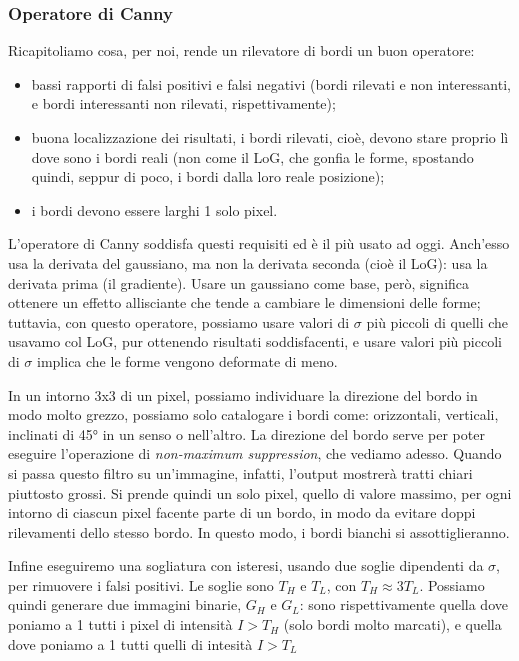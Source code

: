 \documentclass[a4paper,11pt]{article}
\begin{document}
\subsubsection{Operatore di Canny}
Ricapitoliamo cosa, per noi, rende un rilevatore di bordi un buon operatore:
\begin{itemize}
    \item bassi rapporti di falsi positivi e falsi negativi (bordi rilevati e non interessanti, e bordi interessanti non rilevati, rispettivamente);
    \item buona localizzazione dei risultati, i bordi rilevati, cioè, devono stare proprio lì dove sono i bordi reali (non come il LoG, che gonfia le forme,
    spostando quindi, seppur di poco, i bordi dalla loro reale posizione);
    \item i bordi devono essere larghi 1 solo pixel.
\end{itemize}
\par
L'operatore di Canny soddisfa questi requisiti ed è il più usato ad oggi. Anch'esso usa la derivata del gaussiano, ma non la derivata seconda (cioè il LoG):
usa la derivata prima (il gradiente). Usare un gaussiano come base, però, significa ottenere un effetto allisciante che tende a cambiare le dimensioni
delle forme; tuttavia, con questo operatore, possiamo usare valori di $\sigma$ più piccoli di quelli che usavamo col LoG, pur ottenendo risultati
soddisfacenti, e usare valori più piccoli di $\sigma$ implica che le forme vengono deformate di meno.
\par
In un intorno 3x3 di un pixel, possiamo individuare la direzione del bordo in modo molto grezzo, possiamo solo catalogare i bordi come: orizzontali,
verticali, inclinati di 45° in un senso o nell'altro. La direzione del bordo serve per poter eseguire l'operazione di \textit{non-maximum suppression},
che vediamo adesso.
Quando si passa questo filtro su un'immagine, infatti, l'output mostrerà tratti chiari piuttosto grossi. Si prende quindi un solo pixel, quello
di valore massimo, per ogni intorno di ciascun pixel facente parte di un bordo, in modo da evitare doppi rilevamenti dello stesso bordo. In questo modo,
i bordi bianchi si assottiglieranno.
\par
Infine eseguiremo una sogliatura con isteresi, usando due soglie dipendenti da $\sigma$, per rimuovere i falsi positivi. Le soglie sono $T_H$ e $T_L$, con $T_H \approx 3T_L$.
Possiamo quindi generare due immagini binarie, $G_H$ e $G_L$: sono rispettivamente quella
dove poniamo a 1 tutti i pixel di intensità $I > T_H$ (solo bordi molto marcati), e quella dove poniamo a 1 tutti quelli di intesità $I > T_L$
\end{document}
